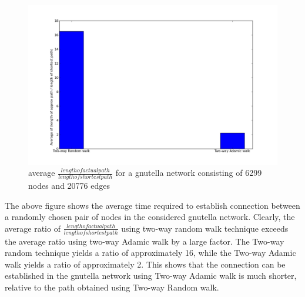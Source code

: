 \documentclass[a4paper,12pt]{article}
\begin{document}
\begin{figure}[htp]
\centering
\includegraphics[scale=0.45]{Results/gnutellaAvrgPath.png}
\caption{average $\frac{length of actual path}{length of shortest path}$ for a gnutella network consisting of 6299 nodes and 20776 edges}
\label{gnuAvrgPath}
\end{figure}
The above figure shows the average time required to establish connection between a randomly chosen pair of nodes in the considered gnutella network. Clearly, the average ratio of $\frac{length of actual path}{length of shortest path}$ using two-way random walk technique exceeds the average ratio using two-way Adamic walk by a large factor. The Two-way random technique yields a ratio of approximately 16, while the Two-way Adamic walk yields a ratio of approximately 2. This shows that the connection can be established in the gnutella network using Two-way Adamic walk is much shorter, relative to the path obtained using Two-way Random walk.
\end{document}
